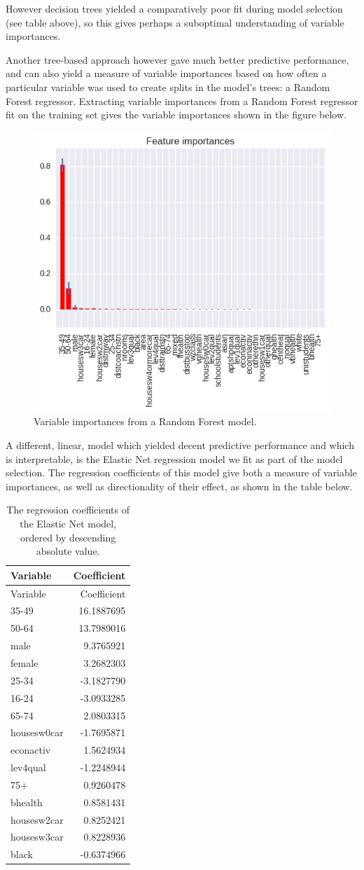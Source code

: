 \documentclass[]{article}
\begin{document}
However decision trees yielded a comparatively poor fit during model
selection (see table above), so this gives perhaps a suboptimal
understanding of variable importances.

Another tree-based approach however gave much better predictive
performance, and can also yield a measure of variable importances based
on how often a particular variable was used to create splits in the
model's trees: a Random Forest regressor. Extracting variable
importances from a Random Forest regressor fit on the training set gives
the variable importances shown in the figure below.

\begin{figure}

{\centering \includegraphics[width=0.6\linewidth]{../figures/random_forest_var_importances} 

}

\caption{Variable importances from a Random Forest model.}\label{fig:unnamed-chunk-7}
\end{figure}

A different, linear, model which yielded decent predictive performance
and which is interpretable, is the Elastic Net regression model we fit
as part of the model selection. The regression coefficients of this
model give both a measure of variable importances, as well as
directionality of their effect, as shown in the table below.

\begin{longtable}[]{@{}lr@{}}
\caption{The regression coefficients of the Elastic Net model, ordered
by descending absolute value.}\tabularnewline
\toprule
Variable & Coefficient\tabularnewline
\midrule
\endfirsthead
\toprule
Variable & Coefficient\tabularnewline
\midrule
\endhead
35-49 & 16.1887695\tabularnewline
50-64 & 13.7989016\tabularnewline
male & 9.3765921\tabularnewline
female & 3.2682303\tabularnewline
25-34 & -3.1827790\tabularnewline
16-24 & -3.0933285\tabularnewline
65-74 & 2.0803315\tabularnewline
housesw0car & -1.7695871\tabularnewline
econactiv & 1.5624934\tabularnewline
lev4qual & -1.2248944\tabularnewline
75+ & 0.9260478\tabularnewline
bhealth & 0.8581431\tabularnewline
housesw2car & 0.8252421\tabularnewline
housesw3car & 0.8228936\tabularnewline
black & -0.6374966\tabularnewline
\bottomrule
\end{longtable}
\end{document}
